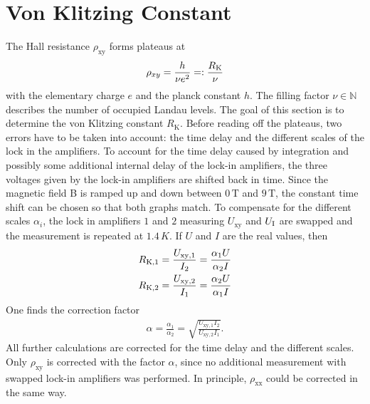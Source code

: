 \section{Von Klitzing Constant}

The Hall resistance $\rho_{\text{xy}}$ forms plateaus at \begin{align}
    \rho_{xy} = \frac{h}{\nu e^2} =: \frac{R_\text K}{\nu} \end{align} with the elementary charge $e$ and the planck constant $h$. 
The filling factor $\nu \in \mathbb N$ describes the number of occupied Landau levels.
The goal of this section is to determine the von Klitzing constant $R_\text{K}$.
Before reading off the plateaus, two errors have to be taken into account: the time delay and the different scales of the lock in the amplifiers.
To account for the time delay caused by integration and possibly some additional internal delay of the lock-in amplifiers, the three voltages given by the lock-in amplifiers are shifted back in time.
Since the magnetic field B is ramped up and down between $0\,\text{T}$ and $9\,\text{T}$, the constant time shift can be chosen so that both graphs match.
To compensate for the different scales $\alpha_i$, the lock in amplifiers $1$ and $2$ measuring $U_\text{xy}$ and $U_\text I$ are swapped and the measurement is repeated at $1.4\,K$.
If $U$ and $I$ are the real values, then 
\begin{align}
    R_{\text K,1} = \frac{U_{\text{xy}, 1}}{I_2} = \frac{\alpha_1 U}{\alpha_2 I}\\ R_{\text K,2} = \frac{U_{\text{xy}, 2}}{I_1} = \frac{\alpha_2 U}{\alpha_1 I}
\end{align} 
One finds the correction factor 
\begin{align}
    \alpha = \frac{\alpha_1}{\alpha_2} = \sqrt{\frac{U_{\text{xy},1}I_2}{U_{\text{xy}, 2}I_1}}. 
\end{align}
All further calculations are corrected for the time delay and the different scales.
Only $\rho_{\text{xy}}$ is corrected with the factor $\alpha$, since no additional measurement with swapped lock-in amplifiers was performed.
In principle, $\rho_{\text{xx}}$ could be corrected in the same way.

